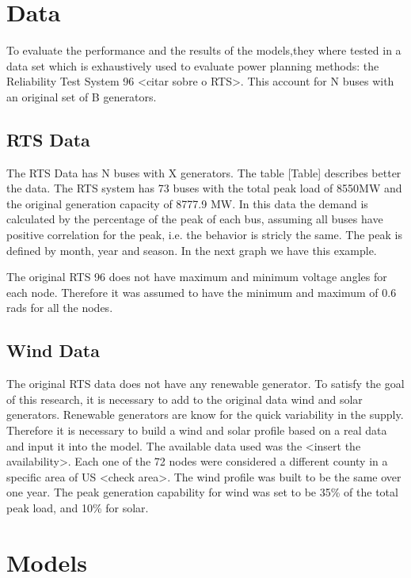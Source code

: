 \documentclass[10pt]{article}
\begin{document}
\section{Data}

To evaluate the performance and the results of the models,they where tested in a data set which is exhaustively used to evaluate power planning methods: the Reliability Test System 96 <citar sobre o RTS>. This account for N buses with an original set of B generators.

\subsection{RTS Data}

The RTS Data has N buses with X generators. The table [Table] describes better the data. The RTS system has 73 buses with the total peak load of 8550MW and the original generation capacity of 8777.9 MW. In this data the demand is calculated by the percentage of the peak of each bus, assuming all buses have positive correlation for the peak, i.e. the behavior is stricly the same. The peak is defined by month, year and season. In the next graph we have this example. 

The original RTS 96 does not have maximum and minimum voltage angles for each node. Therefore it was assumed to have the minimum and maximum of 0.6 rads for all the nodes.

\subsection{Wind Data}

The original RTS data does not have any renewable generator. To satisfy the goal of this research, it is necessary to add to the original data wind and solar generators. Renewable generators are know for the quick variability in the supply. Therefore it is necessary to build a wind and solar profile based on a real data and input it into the model. The available data used was the <insert the availability>. Each one of the 72 nodes were considered a different county in a specific area of US <check area>. The wind profile was built to be the same over one year. The peak generation capability for wind was set to be 35\% of the total peak load, and 10\% for solar. 


\section{Models}
\end{document}
